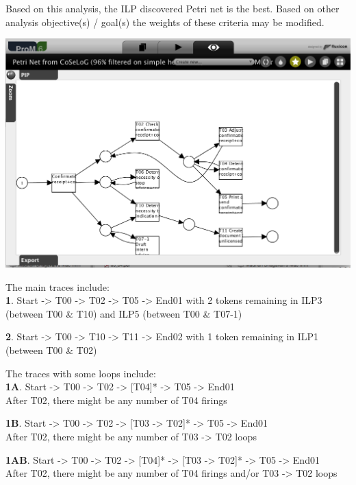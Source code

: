 \documentclass[]{article}
\begin{document}
Based on this analysis, the ILP discovered Petri net is the best. Based
on other analysis objective(s) / goal(s) the weights of these criteria
may be modified.

\includegraphics{CoSeLoG_Step_05_Filter96_PetriNet_ILP.png}

The main traces include:\\\textbf{1}. Start -\textgreater{} T00
-\textgreater{} T02 -\textgreater{} T05 -\textgreater{} End01 with 2
tokens remaining in ILP3 (between T00 \& T10) and ILP5 (between T00 \&
T07-1)

\textbf{2}. Start -\textgreater{} T00 -\textgreater{} T10
-\textgreater{} T11 -\textgreater{} End02 with 1 token remaining in ILP1
(between T00 \& T02)

The traces with some loops include:\\\textbf{1A}. Start -\textgreater{}
T00 -\textgreater{} T02 -\textgreater{} {[}T04{]}* -\textgreater{} T05
-\textgreater{} End01\\ After T02, there might be any number of T04
firings

\textbf{1B}. Start -\textgreater{} T00 -\textgreater{} T02
-\textgreater{} {[}T03 -\textgreater{} T02{]}* -\textgreater{} T05
-\textgreater{} End01\\ After T02, there might be any number of T03
-\textgreater{} T02 loops

\textbf{1AB}. Start -\textgreater{} T00 -\textgreater{} T02
-\textgreater{} {[}T04{]}* -\textgreater{} {[}T03 -\textgreater{}
T02{]}* -\textgreater{} T05 -\textgreater{} End01\\ After T02, there
might be any number of T04 firings and/or T03 -\textgreater{} T02 loops
\end{document}
